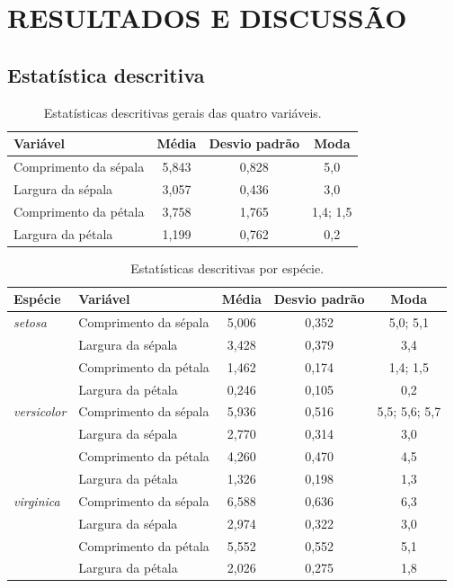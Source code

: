 \documentclass[12pt, a4paper, twoside, chapter=TITLE, subsection=TITLE,
section=TITLE, subsubsection=TITLE, english, brazil]{abntex2}
\begin{document}
\chapter{RESULTADOS E DISCUSSÃO}
\section{Estatística descritiva}

\begin{table}[H]
\centering
\caption{Estatísticas descritivas gerais das quatro variáveis.}
\label{tab:geral}
\begin{tabular}{lccc}
\toprule
Variável & Média & Desvio padrão & Moda \\
\midrule
Comprimento da sépala & 5,843 & 0,828 & 5,0 \\
Largura da sépala & 3,057 & 0,436 & 3,0 \\
Comprimento da pétala & 3,758 & 1,765 & 1,4; 1,5 \\
Largura da pétala & 1,199 & 0,762 & 0,2 \\
\bottomrule
\end{tabular}
\end{table}

\begin{table}[H]
\centering
\caption{Estatísticas descritivas por espécie.}
\label{tab:categoria}
\small
\begin{tabular}{llccc}
\toprule
Espécie & Variável & Média & Desvio padrão & Moda \\
\midrule
\textit{setosa} & Comprimento da sépala & 5,006 & 0,352 & 5,0; 5,1 \\
& Largura da sépala & 3,428 & 0,379 & 3,4 \\
& Comprimento da pétala & 1,462 & 0,174 & 1,4; 1,5 \\
& Largura da pétala & 0,246 & 0,105 & 0,2 \\
\midrule
\textit{versicolor} & Comprimento da sépala & 5,936 & 0,516 & 5,5; 5,6; 5,7 \\
& Largura da sépala & 2,770 & 0,314 & 3,0 \\
& Comprimento da pétala & 4,260 & 0,470 & 4,5 \\
& Largura da pétala & 1,326 & 0,198 & 1,3 \\
\midrule
\textit{virginica} & Comprimento da sépala & 6,588 & 0,636 & 6,3 \\
& Largura da sépala & 2,974 & 0,322 & 3,0 \\
& Comprimento da pétala & 5,552 & 0,552 & 5,1 \\
& Largura da pétala & 2,026 & 0,275 & 1,8 \\
\bottomrule
\end{tabular}
\end{table}
\end{document}
